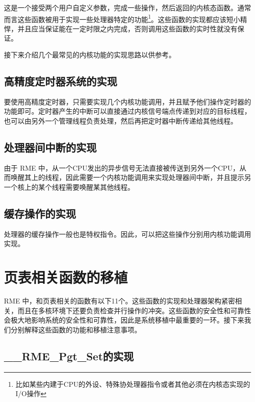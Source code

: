 这是一个接受两个用户自定义参数，完成一些操作，然后返回的内核态函数。通常而言这些函数被用于实现一些处理器特定的功能\footnote{比如某些内建于CPU的外设、特殊协处理器指令或者其他必须在内核态实现的I/O操作}。这些函数的实现都应该短小精悍，并且应当保证能在一定时限之内完成，否则调用这些函数的实时性就没有保证。

接下来介绍几个最常见的内核功能的实现思路以供参考。

\subsection{高精度定时器系统的实现}\label{subsec:7-high-precision-timer-system-implementation}

要使用高精度定时器，只需要实现几个内核功能调用，并且赋予他们操作定时器的功能即可。定时器产生的中断可以直接通过内核信号端点传递到对应的目标线程，也可以由另外一个管理线程负责处理，然后再把定时器中断传递给其他线程。

\subsection{处理器间中断的实现}\label{subsec:7-inter-processor-interrupt-implementation}

由于 RME 中，从一个CPU发出的异步信号无法直接被传送到另外一个CPU，从而唤醒其上的线程，因此需要一个内核功能调用来实现处理器间中断，并且提示另一个核上的某个线程需要唤醒某其他线程。

\subsection{缓存操作的实现}\label{subsec:7-cache-operation-implementation}

处理器的缓存操作一般也是特权指令。因此，可以把这些操作分别用内核功能调用实现。

\section{页表相关函数的移植}\label{sec:7-page-table-function-porting}

RME 中，和页表相关的函数有以下11个。这些函数的实现和处理器架构紧密相关，而且在多核环境下还要负责检查并行操作的冲突。这些函数的安全性和可靠性会极大地影响系统的安全性和可靠性，因此是系统移植中最重要的一环。接下来我们分别解释这些函数的功能和移植注意事项。

\subsection{\_\_RME\_Pgt\_Set的实现}\label{subsec:7-rme-pgt-set-implementation}

